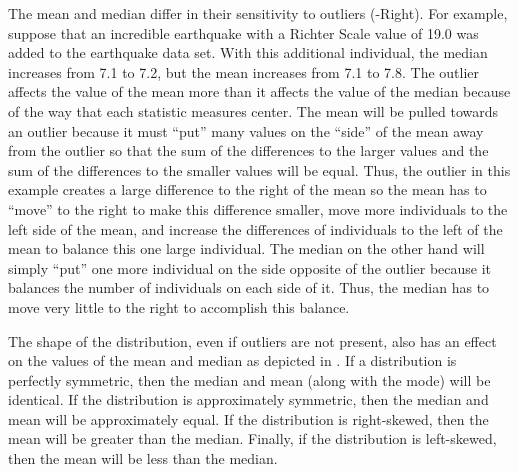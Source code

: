 \documentclass[10pt,openany]{book}\usepackage[]{graphicx}\usepackage[]{color}
\begin{document}
The mean and median differ in their sensitivity to outliers (-Right).  For example, suppose that an incredible earthquake with a Richter Scale value of 19.0 was added to the earthquake data set.  With this additional individual, the median increases from 7.1 to 7.2, but the mean increases from 7.1 to 7.8.  The outlier affects the value of the mean more than it affects the value of the median because of the way that each statistic measures center.  The mean will be pulled towards an outlier because it must ``put'' many values on the ``side'' of the mean away from the outlier so that the sum of the differences to the larger values and the sum of the differences to the smaller values will be equal.  Thus, the outlier in this example creates a large difference to the right of the mean so the mean has to ``move'' to the right to make this difference smaller, move more individuals to the left side of the mean, and increase the differences of individuals to the left of the mean to balance this one large individual.  The median on the other hand will simply ``put'' one more individual on the side opposite of the outlier because it balances the number of individuals on each side of it.  Thus, the median has to move very little to the right to accomplish this balance.


The shape of the distribution, even if outliers are not present, also has an effect on the values of the mean and median as depicted in .  If a distribution is perfectly symmetric, then the median and mean (along with the mode) will be identical.  If the distribution is approximately symmetric, then the median and mean will be approximately equal.  If the distribution is right-skewed, then the mean will be greater than the median.  Finally, if the distribution is left-skewed, then the mean will be less than the median.
\end{document}
